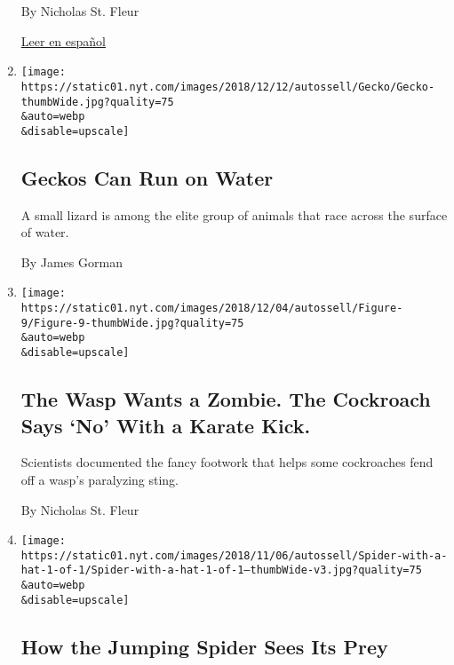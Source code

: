 \begin{enumerate}
  By Nicholas St. Fleur

  \href{https://www.nytimes.com/es/2019/01/12/volcanes-explosiones-lava/}{Leer
  en español}
\item
  \href{/2018/12/11/science/geckos-running-water.html}{}

  \texttt{[image: https://static01.nyt.com/images/2018/12/12/autossell/Gecko/Gecko-thumbWide.jpg?quality=75\\\&auto=webp\\\&disable=upscale]}

  \hypertarget{geckos-can-run-on-water}{%
  \subsection{Geckos Can Run on Water}\label{geckos-can-run-on-water}}

  A small lizard is among the elite group of animals that race across
  the surface of water.

  By James Gorman
\item
  \href{/2018/11/27/science/cockroach-kick-wasp.html}{}

  \texttt{[image: https://static01.nyt.com/images/2018/12/04/autossell/Figure-9/Figure-9-thumbWide.jpg?quality=75\\\&auto=webp\\\&disable=upscale]}

  \hypertarget{the-wasp-wants-a-zombie-the-cockroach-says-no-with-a-karate-kick}{%
  \subsection{The Wasp Wants a Zombie. The Cockroach Says `No' With a
  Karate
  Kick.}\label{the-wasp-wants-a-zombie-the-cockroach-says-no-with-a-karate-kick}}

  Scientists documented the fancy footwork that helps some cockroaches
  fend off a wasp's paralyzing sting.

  By Nicholas St. Fleur
\item
  \href{/2018/11/06/science/spider-vision.html}{}

  \texttt{[image: https://static01.nyt.com/images/2018/11/06/autossell/Spider-with-a-hat-1-of-1/Spider-with-a-hat-1-of-1--thumbWide-v3.jpg?quality=75\\\&auto=webp\\\&disable=upscale]}

  \hypertarget{how-the-jumping-spider-sees-its-prey}{%
  \subsection{How the Jumping Spider Sees Its
  Prey}\label{how-the-jumping-spider-sees-its-prey}}


\end{enumerate}
